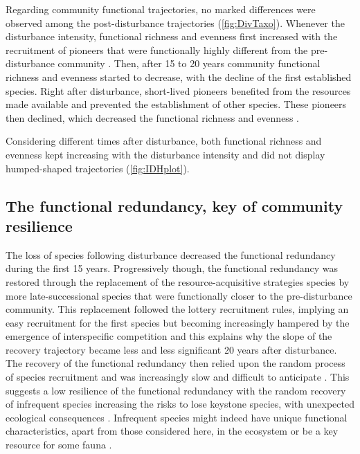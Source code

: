 \documentclass[fleqn,10pt]{ArtEcoFoG} %
\begin{document}
Regarding community functional trajectories, no marked differences were
observed among the post-disturbance trajectories (\ref{fig:DivTaxo}).
Whenever the disturbance intensity, functional richness and evenness
first increased with the recruitment of pioneers that were functionally
highly different from the pre-disturbance community
\citep{Denslow1980, Molino2001}. Then, after 15 to 20 years community
functional richness and evenness started to decrease, with the decline
of the first established species. Right after disturbance, short-lived
pioneers benefited from the resources made available and prevented the
establishment of other species. These pioneers then declined, which
decreased the functional richness and evenness \citep{Walker2009}.

Considering different times after disturbance, both functional richness
and evenness kept increasing with the disturbance intensity and did not
display humped-shaped trajectories (\ref{fig:IDHplot}).

\subsection{The functional redundancy, key of community
resilience}\label{the-functional-redundancy-key-of-community-resilience}

The loss of species following disturbance decreased the functional
redundancy during the first 15 years. Progressively though, the
functional redundancy was restored through the replacement of the
resource-acquisitive strategies species by more late-successional
species that were functionally closer to the pre-disturbance community.
This replacement followed the lottery recruitment rules, implying an
easy recruitment for the first species but becoming increasingly
hampered by the emergence of interspecific competition
\citep{Busing2002} and this explains why the slope of the recovery
trajectory became less and less significant 20 years after disturbance.
The recovery of the functional redundancy then relied upon the random
process of species recruitment and was increasingly slow and difficult
to anticipate \citep{Elmqvist2003, Diaz2005}. This suggests a low
resilience of the functional redundancy with the random recovery of
infrequent species increasing the risks to lose keystone species, with
unexpected ecological consequences
\citep{Jones1994, Chazdon2003a, Diaz2005}. Infrequent species might
indeed have unique functional characteristics, apart from those
considered here, in the ecosystem or be a key resource for some fauna
\citep{Schleuning2016}.
\end{document}
